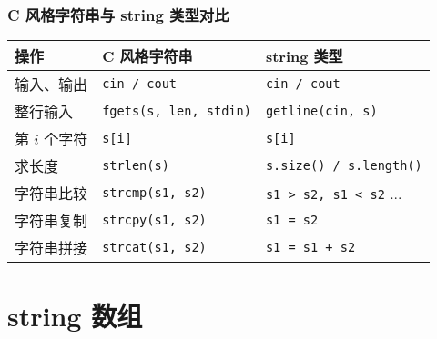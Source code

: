 \begin{frame}[fragile]
    \frametitle{C 风格字符串与 string 类型对比}

    \begin{table}[!ht]
        \centering
        \renewcommand{\arraystretch}{1.5} %
        \begin{tabular}{p{2.2cm}p{3.5cm}p{4cm}}
        \hline
            \textbf{操作}   & \textbf{C 风格字符串}   & \textbf{string 类型} \\ \hline
            输入、输出       & \lstinline|cin / cout|            & \lstinline|cin / cout| \\ 
            整行输入         & \lstinline|fgets(s, len, stdin)|   & \lstinline|getline(cin, s)| \\ 
            第 $i$ 个字符    & \lstinline|s[i]|                  & \lstinline|s[i]| \\ 
            求长度          & \lstinline|strlen(s)|            & \lstinline|s.size() / s.length()| \\
            字符串比较       & \lstinline|strcmp(s1, s2)|        & \lstinline|s1 > s2, s1 < s2| ... \\
            字符串复制       & \lstinline|strcpy(s1, s2)|        & \lstinline|s1 = s2| \\ 
            字符串拼接       & \lstinline|strcat(s1, s2)|        & \lstinline|s1 = s1 + s2| \\\hline
        \end{tabular} 
    \end{table}
            
\end{frame}


\section{string 数组}

